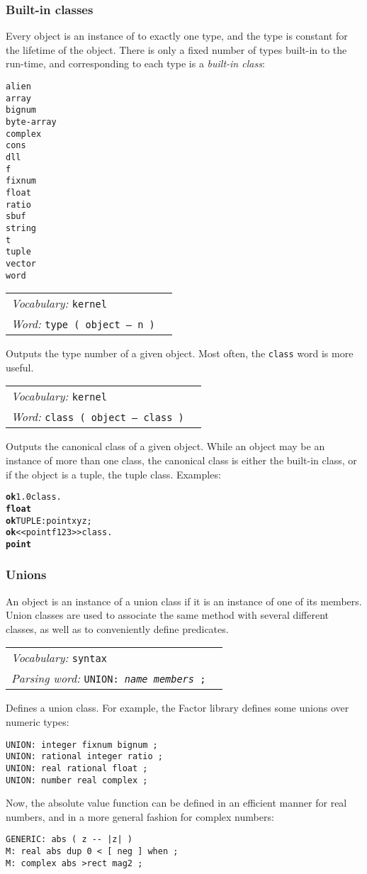 \documentclass{book}
\newcommand{\vocabulary}[1]{\emph{Vocabulary:} \texttt{#1}&\\}
\newcommand{\parsingword}[2]{\index{\texttt{#1}}\emph{Parsing word:} \texttt{#2}&\\}
\newcommand{\ordinaryword}[2]{\index{\texttt{#1}}\emph{Word:} \texttt{#2}&\\}
\newcommand{\wordtable}[1]{

\begin{tabularx}{12cm}[t]{lX}
\hline
#1
\hline
\end{tabularx}

}
\begin{document}
\subsubsection{Built-in classes}
Every object is an instance of to exactly one type, and the type is constant for the lifetime of the object. There is only a fixed number of types built-in to the run-time, and corresponding to each type is a \emph{built-in class}:
\begin{verbatim}
alien
array
bignum
byte-array
complex
cons
dll
f
fixnum
float
ratio
sbuf
string
t
tuple
vector
word
\end{verbatim}
\wordtable{
\vocabulary{kernel}
\ordinaryword{type}{type ( object -- n )}
}
Outputs the type number of a given object. Most often, the \texttt{class} word is more useful.
\wordtable{
\vocabulary{kernel}
\ordinaryword{class}{class ( object -- class )}
}
Outputs the canonical class of a given object. While an object may be an instance of more than one class, the canonical class is either the built-in class, or if the object is a tuple, the tuple class. Examples:
\begin{alltt}
\textbf{ok} 1.0 class .
\textbf{float}
\textbf{ok} TUPLE: point x y z ;
\textbf{ok} << point f 1 2 3 >> class .
\textbf{point}
\end{alltt}

\subsubsection{Unions}
An object is an instance of a union class if it is an instance of one of its members. Union classes are used to associate the same method with several different classes, as well as to conveniently define predicates.
\wordtable{
\vocabulary{syntax}
\parsingword{UNION:}{UNION: \emph{name} \emph{members} ;}
}
Defines a union class. For example, the Factor library defines some unions over numeric types:
\begin{verbatim}
UNION: integer fixnum bignum ;
UNION: rational integer ratio ;
UNION: real rational float ;
UNION: number real complex ;
\end{verbatim}
Now, the absolute value function can be defined in an efficient manner
for real numbers, and in a more general fashion for complex numbers:
\begin{verbatim}
GENERIC: abs ( z -- |z| )
M: real abs dup 0 < [ neg ] when ;
M: complex abs >rect mag2 ;
\end{verbatim}
\end{document}
